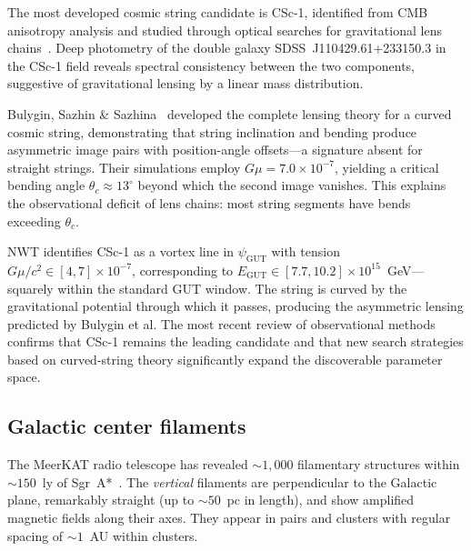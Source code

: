 \documentclass[11pt]{article}
\begin{document}
The most developed cosmic string candidate is CSc-1, identified from CMB anisotropy analysis and studied through optical searches for gravitational lens chains~\cite{Sazhina2019}.
Deep photometry of the double galaxy SDSS~J110429.61+233150.3 in the CSc-1 field reveals spectral consistency between the two components, suggestive of gravitational lensing by a linear mass distribution.

Bulygin, Sazhin \& Sazhina~\cite{Bulygin2023} developed the complete lensing theory for a curved cosmic string, demonstrating that string inclination and bending produce asymmetric image pairs with position-angle offsets---a signature absent for straight strings.
Their simulations employ $G\mu = 7.0 \times 10^{-7}$, yielding a critical bending angle $\theta_c \approx 13^\circ$ beyond which the second image vanishes.
This explains the observational deficit of lens chains: most string segments have bends exceeding $\theta_c$.

NWT identifies CSc-1 as a vortex line in $\psi_\text{GUT}$ with tension $G\mu/c^2 \in [4, 7] \times 10^{-7}$, corresponding to $E_\text{GUT} \in [7.7, 10.2] \times 10^{15}$~GeV---squarely within the standard GUT window.
The string is curved by the gravitational potential through which it passes, producing the asymmetric lensing predicted by Bulygin et al.
The most recent review of observational methods~\cite{Sazhina2025} confirms that CSc-1 remains the leading candidate and that new search strategies based on curved-string theory significantly expand the discoverable parameter space.

\subsection{Galactic center filaments}

The MeerKAT radio telescope has revealed $\sim 1{,}000$ filamentary structures within $\sim 150$~ly of Sgr~A*~\cite{YusefZadeh2022}.
The \emph{vertical} filaments are perpendicular to the Galactic plane, remarkably straight (up to $\sim 50$~pc in length), and show amplified magnetic fields along their axes.
They appear in pairs and clusters with regular spacing of $\sim 1$~AU within clusters.
\end{document}
